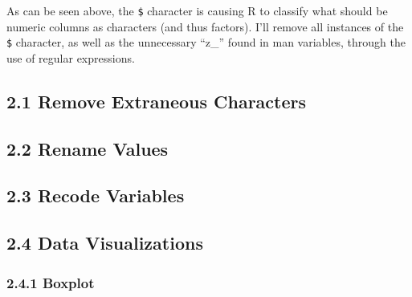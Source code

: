 \documentclass[]{article}
\begin{document}
As can be seen above, the \texttt{\$} character is causing R to classify
what should be numeric columns as characters (and thus factors). I'll
remove all instances of the \texttt{\$} character, as well as the
unnecessary ``z\_'' found in man variables, through the use of regular
expressions.

\subsection{2.1 Remove Extraneous
Characters}\label{remove-extraneous-characters}

\subsection{2.2 Rename Values}\label{rename-values}

\subsection{2.3 Recode Variables}\label{recode-variables}

\subsection{2.4 Data Visualizations}\label{data-visualizations}

\subsubsection{2.4.1 Boxplot}\label{boxplot}
\end{document}
